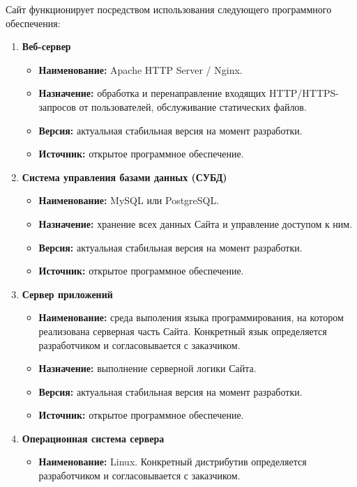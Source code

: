 
Сайт функционирует посредством использования следующего программного обеспечения:

\begin{enumerate}
    \item \textbf{Веб-сервер}
    \begin{itemize}
        \item \textbf{Наименование:} Apache HTTP Server / Nginx.
        \item \textbf{Назначение:} обработка и перенаправление входящих HTTP/HTTPS-запросов от пользователей, обслуживание статических файлов.
        \item \textbf{Версия:} актуальная стабильная версия на момент разработки.
        \item \textbf{Источник:} открытое программное обеспечение.
    \end{itemize}
    \item \textbf{Система управления базами данных (СУБД)}
    \begin{itemize}
        \item \textbf{Наименование:} MySQL или PostgreSQL.
        \item \textbf{Назначение:} хранение всех данных Сайта и управление доступом к ним.
        \item \textbf{Версия:} актуальная стабильная версия на момент разработки.
        \item \textbf{Источник:} открытое программное обеспечение.
    \end{itemize}
    \item \textbf{Сервер приложений}
    \begin{itemize}
        \item \textbf{Наименование:} среда выполения языка программирования, на котором реализована серверная часть Сайта. Конкретный язык определяется разработчиком и согласовывается с заказчиком.
        \item \textbf{Назначение:} выполнение серверной логики Сайта.
        \item \textbf{Версия:} актуальная стабильная версия на момент разработки.
        \item \textbf{Источник:} открытое программное обеспечение.
    \end{itemize}
    \item \textbf{Операционная система сервера}
    \begin{itemize}
        \item \textbf{Наименование:} Linux. Конкретный дистрибутив определяется разработчиком и согласовывается с заказчиком.

\end{itemize}
\end{enumerate}
